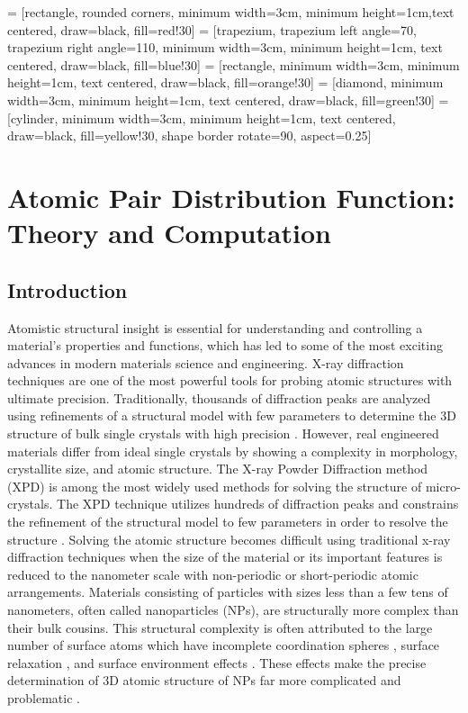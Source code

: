 \graphicspath{{./pdf/figures/}}
 = [rectangle, rounded corners, minimum width=3cm, minimum height=1cm,text centered, draw=black, fill=red!30]
 = [trapezium, trapezium left angle=70, trapezium right angle=110, minimum width=3cm, minimum height=1cm, text centered, draw=black, fill=blue!30]
 = [rectangle, minimum width=3cm, minimum height=1cm, text centered, draw=black, fill=orange!30]
 = [diamond, minimum width=3cm, minimum height=1cm, text centered, draw=black, fill=green!30]
\usetikzlibrary{shapes.geometric}
 = [cylinder, minimum width=3cm, minimum height=1cm, text centered, draw=black, fill=yellow!30, shape border rotate=90, aspect=0.25]

\chapter{Atomic Pair Distribution Function: \\Theory and Computation} \label{ch:pdf}
\section{Introduction}
Atomistic structural insight is essential for understanding and controlling a material's properties and functions, which has led to some of the most exciting advances in modern materials science and engineering.
X-ray diffraction techniques are one of the most powerful tools for probing atomic structures with ultimate precision.
Traditionally, thousands of diffraction peaks are analyzed using refinements of a structural  model with few parameters to determine the 3D structure of bulk single crystals with high precision \cite{Giacovazzo1992}.
However, real engineered materials differ from ideal single crystals by showing a complexity in morphology, crystallite size, and atomic structure.
The  X-ray Powder Diffraction method (XPD) is among the most widely used methods for solving the structure of micro-crystals.
The XPD technique utilizes hundreds of diffraction peaks and constrains the refinement of the structural model to few parameters in order to resolve the structure \cite{Pecharsky2009}.
Solving the atomic structure becomes difficult using traditional x-ray diffraction techniques when the size of the material or its important features is reduced to the nanometer scale with non-periodic or short-periodic atomic arrangements.
Materials consisting of particles with sizes less than a few tens of nanometers, often called nanoparticles (NPs), are structurally more complex than their bulk cousins.
This structural complexity is often attributed to the large number of surface atoms which have incomplete coordination spheres \cite{Sun2007}, surface relaxation \cite{Huang2008}, and surface environment effects \cite{Petkov2013, Gilbert2004, Marks1994}.
These effects make the precise determination of 3D atomic structure of NPs far more complicated and problematic \cite{Billinge2007a}.

